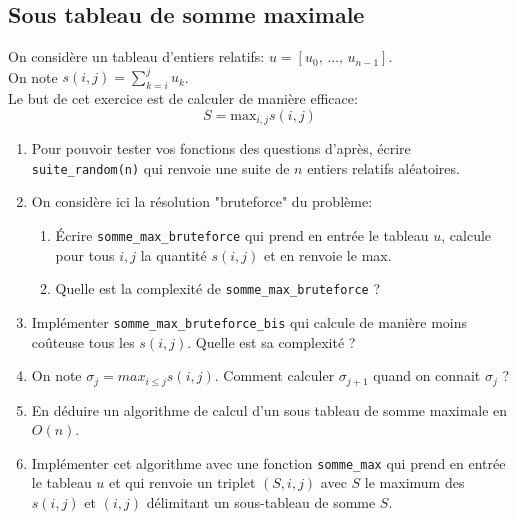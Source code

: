 \subsection{Sous tableau de somme maximale}

On considère un tableau d'entiers relatifs: $u=[u_0,\, \dots,\, u_{n-1}]$. \\
On note $s(i,j) = \sum_{k=i}^j u_k$. \\
Le but de cet exercice est de calculer de manière efficace: 
$$ S = \text{max}_{i,j} s(i,j)$$

\begin{enumerate}
\item Pour pouvoir tester vos fonctions des questions d'après, écrire \texttt{suite\_random(n)} qui renvoie une suite de $n$ entiers 
relatifs aléatoires.
\item On considère ici la résolution "bruteforce" du problème:
\begin{enumerate}
\item Écrire \texttt{somme\_max\_bruteforce} qui prend en entrée le tableau $u$, calcule pour tous $i,j$ la quantité $s(i,j)$ et en renvoie le max.
\item Quelle est la complexité de \texttt{somme\_max\_bruteforce} ?
\end{enumerate}
\item Implémenter \texttt{somme\_max\_bruteforce\_bis} qui calcule de manière moins coûteuse tous les $s(i,j)$. Quelle est sa complexité ?

\item On note $\sigma_j = max_{i \leq j} s(i,j)$. Comment calculer $\sigma_{j+1}$ quand on connait $\sigma_j$ ?
\item En déduire un algorithme de calcul d'un sous tableau de somme maximale en $O(n)$.
\item Implémenter cet algorithme avec une fonction \texttt{somme\_max} qui prend en entrée le tableau $u$ et qui renvoie un triplet $(S,i,j)$ avec $S$ le maximum des $s(i,j)$ et $(i,j)$ délimitant un sous-tableau de somme $S$.

\end{enumerate}
